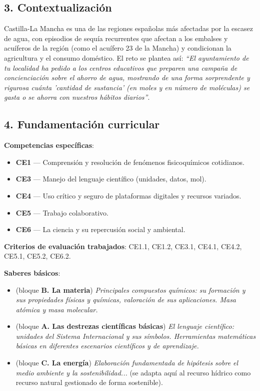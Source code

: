 \documentclass[11pt,a4paper]{article}
\begin{document}
\subsection*{3. Contextualización}
Castilla-La Mancha es una de las regiones españolas más afectadas por la escasez de agua, con episodios de sequía recurrentes que afectan a los embalses y acuíferos de la región (como el acuífero 23 de la Mancha) y condicionan la agricultura y el consumo doméstico. El reto se plantea así: \textit{``El ayuntamiento de tu localidad ha pedido a los centros educativos que preparen una campaña de concienciación sobre el ahorro de agua, mostrando de una forma sorprendente y rigurosa cuánta 'cantidad de sustancia' (en moles y en número de moléculas) se gasta o se ahorra con nuestros hábitos diarios''}.

\subsection*{4. Fundamentación curricular}
\textbf{Competencias específicas}:
\begin{itemize}
    \item \textbf{CE1} --- Comprensión y resolución de fenómenos fisicoquímicos cotidianos.
    \item \textbf{CE3} --- Manejo del lenguaje científico (unidades, datos, mol).
    \item \textbf{CE4} --- Uso crítico y seguro de plataformas digitales y recursos variados.
    \item \textbf{CE5} --- Trabajo colaborativo.
    \item \textbf{CE6} --- La ciencia y su repercusión social y ambiental.
\end{itemize}

\textbf{Criterios de evaluación trabajados}: CE1.1, CE1.2, CE3.1, CE4.1, CE4.2, CE5.1, CE5.2, CE6.2.

\textbf{Saberes básicos}:
\begin{itemize}
    \item (bloque \textbf{B. La materia}) \textit{Principales compuestos químicos: su formación y sus propiedades físicas y químicas, valoración de sus aplicaciones. Masa atómica y masa molecular.}
    \item (bloque \textbf{A. Las destrezas científicas básicas}) \textit{El lenguaje científico: unidades del Sistema Internacional y sus símbolos. Herramientas matemáticas básicas en diferentes escenarios científicos y de aprendizaje.}
    \item (bloque \textbf{C. La energía}) \textit{Elaboración fundamentada de hipótesis sobre el medio ambiente y la sostenibilidad...} (se adapta aquí al recurso hídrico como recurso natural gestionado de forma sostenible).
\end{itemize}
\end{document}

